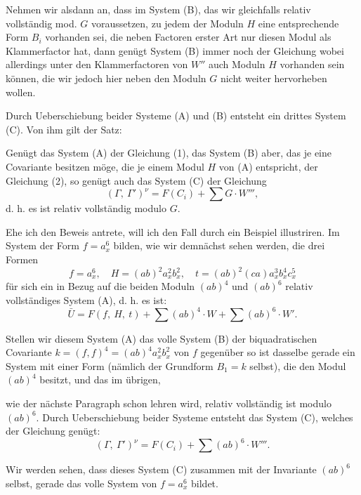 Nehmen wir alsdann an, dass im System (B), das wir gleichfalls relativ
vollständig mod. $G$ voraussetzen, zu jedem der Moduln $H$ eine
entsprechende Form $B_i$ vorhanden sei, die neben Factoren erster Art nur
diesen Modul als Klammerfactor hat, dann genügt System (B) immer noch der
Gleichung
wobei allerdings unter den Klammerfactoren von $W''$ auch Moduln $H$
vorhanden sein können, die wir jedoch hier neben den Moduln $G$ nicht
weiter hervorheben wollen.

Durch Ueberschiebung beider Systeme (A) und (B) entsteht ein drittes
System (C). Von ihm gilt der Satz:

\glqq Genügt das System (A) der Gleichung (1), das System (B) aber, das
je eine Covariante besitzen möge, die je einem Modul $H$ von (A)
entspricht, der Gleichung (2), so genügt auch das System (C) der
Gleichung
\[ (\Gamma,\ \Gamma')^\nu = F(C_i) + \sum G\cdot W''', \]
d. h. es ist relativ vollständig modulo $G$.\grqq{}

Ehe ich den Beweis antrete, will ich den Fall durch ein Beispiel
illustriren. Im System der Form $f=a_x^6$ bilden, wie wir demnächst sehen
werden, die drei Formen
\[ f = a_x^6,\quad H = (ab)^2 a_x^2 b_x^2,\quad t = (ab)^2(ca) a_x^3 b_x^4 c_x^5 \]
für sich ein in Bezug auf die beiden Moduln $(ab)^4$ und $(ab)^6$ relativ
vollständiges System (A), d. h. es ist:
\[ \bar U = F(f,\ H,\ t) + \sum (ab)^4\cdot W + \sum (ab)^6\cdot W'. \]

Stellen wir diesem System (A) das volle System (B) der biquadratischen
Covariante $k=(f,f)^4=(ab)^4a_x^2b_x^2$ von $f$ gegenüber
so ist dasselbe gerade ein System mit einer Form (nämlich der Grundform
$B_1=k$ selbst), die den Modul $(ab)^4$ besitzt, und das im übrigen,


wie der nächste Paragraph schon lehren wird, relativ vollständig ist
modulo $(ab)^6$. Durch Ueberschiebung beider Systeme entsteht das System
(C), welches der Gleichung genügt:
\[ (\Gamma,\ \Gamma')^\nu = F(C_i) + \sum (ab)^6\cdot W'''. \]

Wir werden sehen, dass dieses System (C) zusammen mit der Invariante
$(ab)^6$ selbst, gerade das volle System von $f=a_x^6$ bildet.

